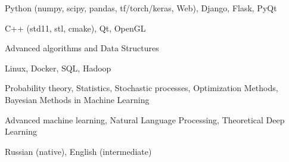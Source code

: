 \documentclass[a4paper,12pt]{memoir} %
\newcommand{\opendialog}{\bluebullet}
\newcommand{\bullitem}[1]{\opendialog #1}
\begin{document}
	
	\begin{figure*}[!htb]
	\begin{minipage}{0.45\textwidth}
		\begin{flushleft}
		
		\bullitem{Python (numpy, scipy, pandas, tf/torch/keras, Web), Django, Flask, PyQt}
		
		\bullitem{C++ (std11, stl, cmake), Qt, OpenGL}
		
		\bullitem{Advanced algorithms and Data Structures}
		
		\bullitem{Linux, Docker, SQL, Hadoop}
	\end{flushleft}
	\end{minipage}\hfill	\begin{minipage}{0.45\textwidth}
		\begin{flushleft}
		
	\bullitem{Probability theory, Statistics, Stochastic processes, Optimization Methods, Bayesian Methods in Machine Learning}	
	
	\bullitem{Advanced machine learning, Natural Language Processing, Theoretical Deep Learning}
			
	\bullitem{Russian (native), English (intermediate)}
\end{flushleft}
	\end{minipage}	


\end{figure*}				
	
\end{document}
